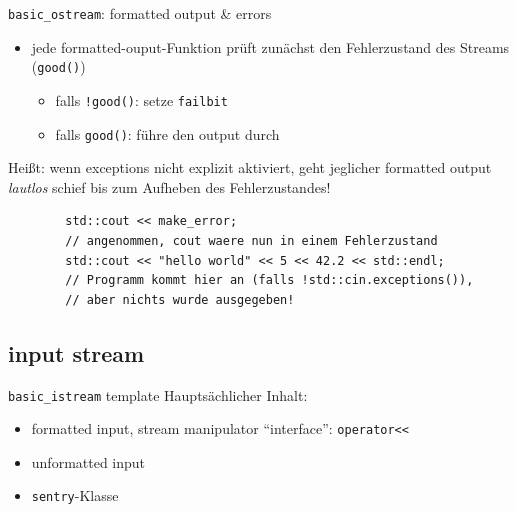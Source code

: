 \begin{frame}[fragile]{\texttt{basic\_ostream}: formatted output \& errors}
	\begin{itemize}
		\item jede formatted-ouput-Funktion prüft zunächst den Fehlerzustand des Streams (\texttt{good()})
		\begin{itemize}
			\item falls \texttt{!good()}: setze \texttt{failbit}
			\item falls \texttt{good()}: führe den output durch
		\end{itemize}
	\end{itemize}
	
	\pause
	\vspace{2em}
	
	Heißt: wenn exceptions nicht explizit aktiviert, geht jeglicher formatted output \emph{lautlos} schief bis zum Aufheben des Fehlerzustandes!
	
	\begin{lstlisting}
		std::cout << make_error;
		// angenommen, cout waere nun in einem Fehlerzustand
		std::cout << "hello world" << 5 << 42.2 << std::endl;
		// Programm kommt hier an (falls !std::cin.exceptions()),
		// aber nichts wurde ausgegeben!
	\end{lstlisting}
\end{frame}


\subsection{input stream}

\begin{frame}{\texttt{basic\_istream} template}
	Hauptsächlicher Inhalt:
	\begin{itemize}
		\item formatted input, stream manipulator \enquote{interface}: \texttt{operator<<}
		\item unformatted input
		\item \texttt{sentry}-Klasse
	\end{itemize}
\end{frame}

